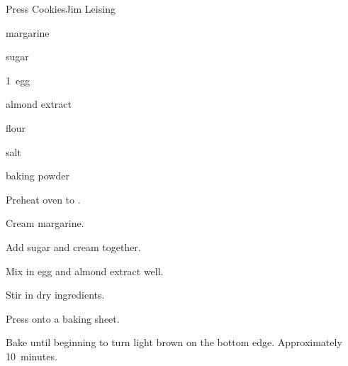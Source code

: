\begin{recipe}{Press Cookies}{Jim Leising}{}

\begin{ingredients}
\item {} margarine
\item \C{\threequarter} sugar
\item 1~egg
\item \tp{\quarter} almond extract
\item \C{2\quarter} flour
\item \tp{\half} salt
\item \tp{\quarter} baking powder
\end{ingredients}

\begin{directions}
\item Preheat oven to .
\item Cream margarine.
\item Add sugar and cream together.
\item Mix in egg and almond extract well.
\item Stir in dry ingredients.
\item Press onto a baking sheet.
\item Bake until beginning to turn light brown on the bottom edge. Approximately 10~minutes.
\end{directions}

\end{recipe}
